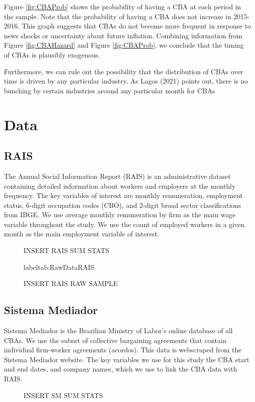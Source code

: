 \documentclass[12pt]{article}
\begin{document}
		Figure \ref{fig:CBAProb} shows the probability of having a CBA at each period in the sample. Note that the probability of having a CBA does not increase in 2015-2016. This graph suggests that CBAs do not become more frequent in response to news shocks or uncertainty about future inflation.
		Combining information from Figure \ref{fig:CBAHazard} and Figure \ref{fig:CBAProb}, we conclude that the timing of CBAs is plausibly exogenous. 

		Furthermore, we can rule out the possibility that the distribution of CBAs over time is driven by any particular industry. As Lagos (2021) points out, there is no bunching by certain industries around any particular month for CBAs \cite{lagosLaborMarketInstitutions2021}
	\section{Data}
		\subsection{RAIS}
		The Annual Social Information Report (RAIS) is an administrative dataset containing detailed information about workers and employers at the monthly frequency. The key variables of interest are monthly remuneration, employment status, 6-digit occupation codes (CBO), and 2-digit broad sector classifications from IBGE. We use average monthly remuneration by firm as the main wage variable throughout the study. We use the count of employed workers in a given month as the main employment variable of interest. 
		\begin{figure}
			\centering
			\caption{INSERT RAIS SUM STATS}
			\label{tab:SumStatsRAIS}
		\end{figure}

		\begin{figure}
			\centering
			\caption{INSERT RAIS RAW SAMPLE}
			label{tab:RawDataRAIS}
		\end{figure}

		\subsection{Sistema Mediador}
		Sistema Mediador is the Brazilian Ministry of Labor's online database of all CBAs. We use the subset of collective bargaining agreements that contain individual firm-worker agreements (acordos). This data is webscraped from the Sistema Mediador website. The key variables we use for this study the CBA start and end dates, and company names, which we use to link the CBA data with RAIS.
		\begin{figure}
			\centering
			\caption{INSERT SM SUM STATS}
			\label{tab:SumStatsRAIS}
		\end{figure}
\end{document}
